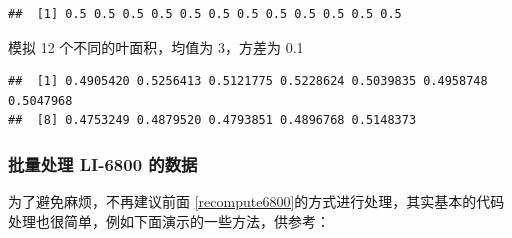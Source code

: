 \documentclass[
]{krantz}
\makeatletter
\newenvironment{Shaded}{\begin{snugshade}}{\end{snugshade}}
\newcommand{\AttributeTok}[1]{\textcolor[rgb]{0.77,0.63,0.00}{#1}}
\newcommand{\DecValTok}[1]{\textcolor[rgb]{0.00,0.00,0.81}{#1}}
\newcommand{\FloatTok}[1]{\textcolor[rgb]{0.00,0.00,0.81}{#1}}
\newcommand{\FunctionTok}[1]{\textcolor[rgb]{0.00,0.00,0.00}{#1}}
\newcommand{\NormalTok}[1]{#1}
\newcommand{\OtherTok}[1]{\textcolor[rgb]{0.56,0.35,0.01}{#1}}
\newcommand{\SpecialCharTok}[1]{\textcolor[rgb]{0.00,0.00,0.00}{#1}}
\newcommand{\StringTok}[1]{\textcolor[rgb]{0.31,0.60,0.02}{#1}}
\newenvironment{kframe}{%
\medskip{}
\setlength{\fboxsep}{.8em}
 \def\at@end@of@kframe{}%
 \ifinner\ifhmode%
  \def\at@end@of@kframe{\end{minipage}}%
  \begin{minipage}{\columnwidth}%
 \fi\fi%
 \def\FrameCommand##1{\hskip\@totalleftmargin \hskip-\fboxsep
 \colorbox{shadecolor}{##1}\hskip-\fboxsep
     \hskip-\linewidth \hskip-\@totalleftmargin \hskip\columnwidth}%
 \MakeFramed {\advance\hsize-\width
   \@totalleftmargin\z@ \linewidth\hsize
   \@setminipage}}%
 {\par\unskip\endMakeFramed%
 \at@end@of@kframe}
\renewenvironment{Shaded}{\begin{kframe}}{\end{kframe}}
\makeatother
\begin{document}
\begin{verbatim}
##  [1] 0.5 0.5 0.5 0.5 0.5 0.5 0.5 0.5 0.5 0.5 0.5 0.5
\end{verbatim}

模拟 12 个不同的叶面积，均值为 3，方差为 0.1

\begin{Shaded}
\end{Shaded}

\begin{verbatim}
##  [1] 0.4905420 0.5256413 0.5121775 0.5228624 0.5039835 0.4958748 0.5047968
##  [8] 0.4753249 0.4879520 0.4793851 0.4896768 0.5148373
\end{verbatim}

\hypertarget{batch-6800-xlsx}{%
\subsubsection{批量处理 LI-6800 的数据}\label{batch-6800-xlsx}}

为了避免麻烦，不再建议前面 \ref{recompute6800}的方式进行处理，其实基本的代码处理也很简单，例如下面演示的一些方法，供参考：
\end{document}
